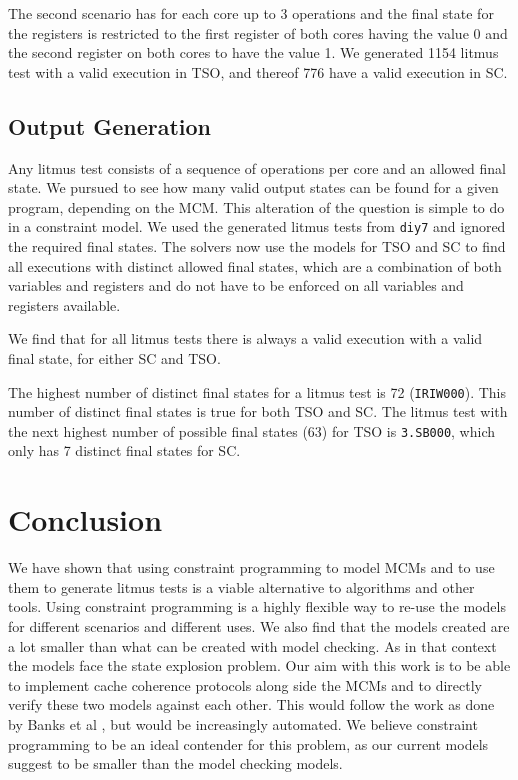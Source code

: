 \documentclass[runningheads]{llncs}
\begin{document}
The second scenario has for each core up to 3 operations and the final state for the registers is restricted to the first register of both cores having the value 0 and the second register on both cores to have the value 1.
We generated 1154 litmus test with a valid execution in TSO, and thereof 776 have a valid execution in SC.

\subsection{Output Generation}
Any litmus test consists of a sequence of operations per core and an allowed final state.
We pursued to see how many valid output states can be found for a given program, depending on the MCM.
This alteration of the question is simple to do in a constraint model.
We used the generated litmus tests from {\tt{diy7}} and ignored the required final states.
The solvers now use the models for TSO and SC to find all executions with distinct allowed final states, which are a combination of both variables and registers and do not have to be enforced on all variables and registers available.

We find that for all litmus tests there is always a valid execution with a valid final state, for either SC and TSO.

The highest number of distinct final states for a litmus test is 72 ({\tt{IRIW000}}).
This number of distinct final states is true for both TSO and SC.
The litmus test with the next highest number of possible final states (63) for TSO is {\tt{3.SB000}}, which only has 7 distinct final states for SC.



\section{Conclusion}
We have shown that using constraint programming to model MCMs and to use them to generate litmus tests is a viable alternative to algorithms and other tools.
Using constraint programming is a highly flexible way to re-use the models for different scenarios and different uses.
We also find that the models created are a lot smaller than what can be created with model checking. As in that context the models face the state explosion problem.
Our aim with this work is to be able to implement cache coherence protocols along side the MCMs and to directly verify these two models against each other.
This would follow the work as done by Banks et al \cite{banks2017verification}, but would be increasingly automated.
We believe constraint programming to be an ideal contender for this problem, as our current models suggest to be smaller than the model checking models.



\end{document}
